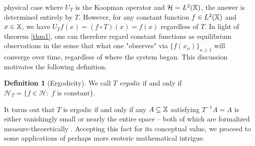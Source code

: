 \documentclass[11pt]{report}
\newcommand{\mc}[1]{\mathcal{#1}}
\theoremstyle{definition}
\newtheorem{definition}{Definition}
\begin{document}
    physical case where $U_T$ is the Koopman operator and $\mc{H}=L^2(\mbb{X})$,
    the answer is determined entirely by $T$. However, for any constant function
    $f\in L^2(\mathbb{X})$ and $x\in\mathbb{X}$, we have $U_Tf(x)=(f\circ T)(x)=f(x)$
    regardless of $T$. In light of theorem \ref{thm1}, one can therefore regard
    constant functions as equilibrium observations in the sense that what one
    "observes" via $\{f(x_n)\}_{n\geq 1}$ will converge over time, regardless of
    where the system began. This discussion motivates the following definition.
    \begin{definition}[Ergodicity]\label{def2} We call $T$ \textit{ergodic} if
        and only if $\mc{H}_T=\{f\in\mc{H}:\;\text{$f$ is constant}\}$.
    \end{definition}
    It turns out that $T$ is ergodic if and only if any $A\subseteq\mathbb{X}$
    satisfying $T^{-1}A=A$ is either vanishingly small or nearly the entire
    space -- both of which are formalized measure-theoretically \cite[$\S$II.5,
    p.59]{Reed_Simon_1972}. Accepting this fact for its conceptual value, we
    proceed to some applications of perhaps more esoteric mathematical intrigue.
\end{document}
